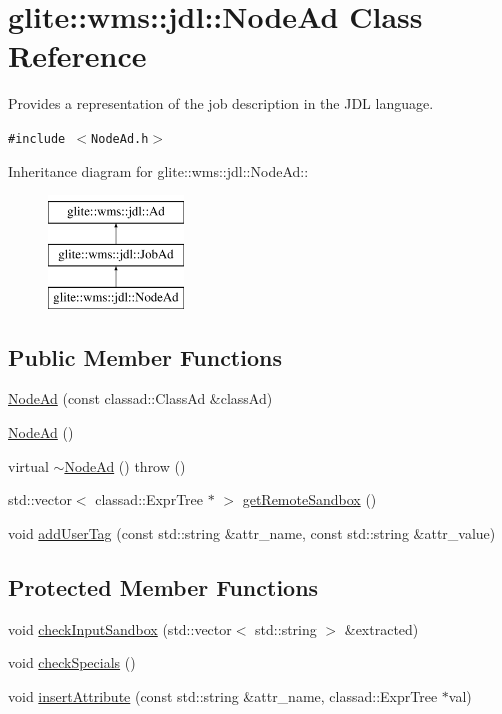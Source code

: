 \hypertarget{classglite_1_1wms_1_1jdl_1_1NodeAd}{
\section{glite::wms::jdl::Node\-Ad Class Reference}
\label{classglite_1_1wms_1_1jdl_1_1NodeAd}
}
Provides a representation of the job description in the JDL language.  


{\tt \#include $<$Node\-Ad.h$>$}

Inheritance diagram for glite::wms::jdl::Node\-Ad::\begin{figure}[H]
\begin{center}
\leavevmode
\includegraphics[height=3cm]{classglite_1_1wms_1_1jdl_1_1NodeAd}
\end{center}
\end{figure}
\subsection*{Public Member Functions}
\begin{CompactItemize}
\item 
\hyperlink{classglite_1_1wms_1_1jdl_1_1NodeAd_a0}{Node\-Ad} (const classad::Class\-Ad \&class\-Ad)
\item 
\hyperlink{classglite_1_1wms_1_1jdl_1_1NodeAd_a1}{Node\-Ad} ()
\item 
virtual \hyperlink{classglite_1_1wms_1_1jdl_1_1NodeAd_a2}{$\sim$Node\-Ad} ()  throw ()
\item 
std::vector$<$ classad::Expr\-Tree $\ast$ $>$ \hyperlink{classglite_1_1wms_1_1jdl_1_1NodeAd_a3}{get\-Remote\-Sandbox} ()
\item 
void \hyperlink{classglite_1_1wms_1_1jdl_1_1NodeAd_a4}{add\-User\-Tag} (const std::string \&attr\_\-name, const std::string \&attr\_\-value)
\end{CompactItemize}
\subsection*{Protected Member Functions}
\begin{CompactItemize}
\item 
void \hyperlink{classglite_1_1wms_1_1jdl_1_1NodeAd_b0}{check\-Input\-Sandbox} (std::vector$<$ std::string $>$ \&extracted)
\item 
void \hyperlink{classglite_1_1wms_1_1jdl_1_1NodeAd_b1}{check\-Specials} ()
\item 
void \hyperlink{classglite_1_1wms_1_1jdl_1_1NodeAd_b2}{insert\-Attribute} (const std::string \&attr\_\-name, classad::Expr\-Tree $\ast$val)
\end{CompactItemize}
